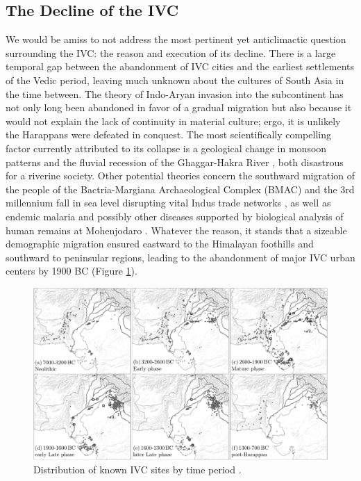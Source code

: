 \documentclass[11pt,a4paper,oneside]{report}
\begin{document}
\subsection{The Decline of the IVC}
\noindent\hspace{1cm}
We would be amiss to not address the most pertinent yet anticlimactic question surrounding the IVC: the reason and execution of its decline. There is a large temporal gap between the abandonment of IVC cities and the earliest settlements of the Vedic period, leaving much unknown about the cultures of South Asia in the time between. The theory of Indo-Aryan invasion into the subcontinent has not only long been abandoned in favor of a gradual migration \cite{reich_reconstructing_2009} but also because it would not explain the lack of continuity in material culture; ergo, it is unlikely the Harappans were defeated in conquest. The most scientifically compelling factor currently attributed to its collapse is a geological change in monsoon patterns and the fluvial recession of the Ghaggar-Hakra River \cite{dutt_climate_2019,giosan_fluvial_2012}, both disastrous for a riverine society. Other potential theories concern the southward migration of the people of the Bactria-Margiana Archaeological Complex (BMAC) and the 3rd millennium fall in sea level disrupting vital Indus trade networks \cite{mcintosh_peaceful_2001}, as well as endemic malaria and possibly other diseases supported by biological analysis of human remains at Mohenjodaro \cite{arnott_disease_2024}. Whatever the reason, it stands that a sizeable demographic migration ensured eastward to the Himalayan foothills and southward to peninsular regions, leading to the abandonment of major IVC urban centers by 1900 BC (Figure \ref{fig:decline}).

\begin{figure}[H] 
    \centering
    \includegraphics[width=1\textwidth]{Images/IVC_migration.png}
    \caption[IVC Site Temporal Distribution Map]{Distribution of known IVC sites by time period \cite{khan_bricks_2013, law_building_2007}.}
    \label{fig:decline}
\end{figure}
\end{document}
